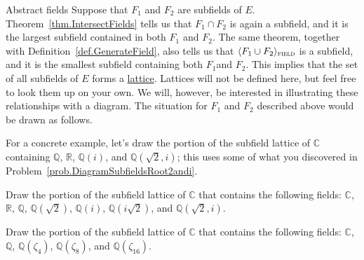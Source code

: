 \begin{section}{Abstract fields}
Suppose that $F_1$ and $F_2$ are subfields of $E$. Theorem~\ref{thm.IntersectFields} tells us that $F_1\cap F_2$ is again a subfield, and it is the largest subfield contained in both $F_1$ and $F_2$. The same theorem, together with Definition~\ref{def.GenerateField}, also tells us that $\langle F_1\cup F_2 \rangle_{\textsc{field}}$ is a subfield, and it is the smallest subfield containing both $F_1$and $F_2$. This implies that the set of all subfields of $E$ forms a \href{https://en.wikipedia.org/wiki/Lattice_(order)}{lattice}. Lattices will not be defined here, but feel free to look them up on your own. We will, however, be interested in illustrating these relationships with a diagram. The situation for $F_1$ and $F_2$ described above would be drawn as follows.
\begin{center}
\end{center}

For a concrete example, let's draw the portion of the subfield lattice of $\mathbb{C}$ containing $\mathbb{Q}$, $\mathbb{R}$, $\mathbb{Q}(i)$, and $\mathbb{Q}\left(\sqrt{2},i\right)$; this uses some of what you discovered in Problem~\ref{prob.DiagramSubfieldsRoot2andi}.

\begin{center}
\end{center}

\begin{problem}\label{prob.LatticeSubfieldsRoot2andi}
Draw the portion of the subfield lattice of $\mathbb{C}$ that contains the following fields:
$\mathbb{C}$, $\mathbb{R}$, $\mathbb{Q}$, $\mathbb{Q}\left(\sqrt{2}\right)$, $\mathbb{Q}(i)$, $\mathbb{Q}\left(i\sqrt{2}\right)$, and $\mathbb{Q}\left(\sqrt{2},i\right)$.
\end{problem}

\begin{problem}
Draw the portion of the subfield lattice of $\mathbb{C}$ that contains the following fields:
$\mathbb{C}$, $\mathbb{Q}$, $\mathbb{Q}(\zeta_4)$, $\mathbb{Q}(\zeta_8)$, and $\mathbb{Q}(\zeta_{16})$.
\end{problem}
\end{section}




